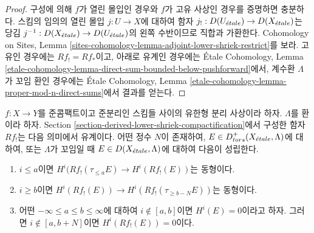 \begin{proof}
구성에 의해 $f$가 열린 몰입인 경우와 $f$가 고유 사상인 경우를
증명하면 충분하다. 스킴의 임의의 열린 몰입 $j : U \to X$에 대하여
함자 $j_! : D(U_{\acute{e}tale}) \to D(X_{\acute{e}tale})$는 당김
$j^{-1} : D(X_{\acute{e}tale}) \to D(U_{\acute{e}tale})$의 왼쪽 수반이므로 직합과
가환한다. Cohomology on Sites, Lemma
\ref{sites-cohomology-lemma-adjoint-lower-shriek-restrict}를 보라.
고유인 경우에는 $Rf_! = Rf_*$이고, 아래로 유계인 경우에는
\'Etale Cohomology, Lemma
\ref{etale-cohomology-lemma-direct-sum-bounded-below-pushforward}에서,
계수환 $\Lambda$가 꼬임 환인 경우에는 \'Etale Cohomology, Lemma
\ref{etale-cohomology-lemma-proper-mod-n-direct-sums}에서 결과를 얻는다.
\end{proof}

\begin{lemma}
\label{lemma-derived-lower-shriek-bounded}
$f : X \to Y$를 준콤팩트이고 준분리인 스킴들 사이의 유한형 분리
사상이라 하자. $\Lambda$를 환이라 하자. Section
\ref{section-derived-lower-shriek-compactification}에서 구성한 함자
$Rf_!$는 다음 의미에서 유계이다. 어떤 정수 $N$이 존재하여,
$E \in D^+_{tors}(X_{\acute{e}tale}, \Lambda)$에 대하여, 또는
$\Lambda$가 꼬임일 때 $E \in D(X_{\acute{e}tale}, \Lambda)$에 대하여
다음이 성립한다.
\begin{enumerate}
\item $i \leq a$이면
$H^i(Rf_!(\tau_{\leq a}E) \to H^i(Rf_!(E))$는 동형이다.
\item $i \geq b$이면
$H^i(Rf_!(E)) \to H^i(Rf_!(\tau_{\geq b - N}E))$는 동형이다.
\item 어떤 $-\infty \leq a \leq b \leq \infty$에 대하여
$i \not \in [a, b]$이면 $H^i(E) = 0$이라고 하자.
그러면 $i \not \in [a, b + N]$이면 $H^i(Rf_!(E)) = 0$이다.
\end{enumerate}
\end{lemma}

